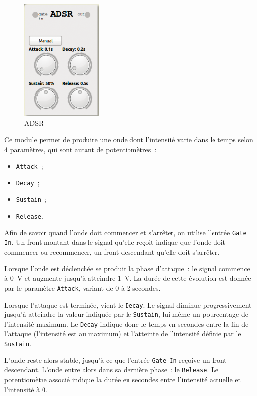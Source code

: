 \documentclass[a4paper,oneside,frenchb,10pt]{article}
\begin{document}
\begin{multicols}{2}
\begin{figure}[H]
\centering
\includegraphics[width=4cm]{../img/png/adsr.png}
\caption{ADSR}
\end{figure}

Ce module permet de produire une onde dont l'intensité varie dans le
temps selon 4 paramètres, qui sont autant de potentiomètres~:

\begin{itemize}
\item
  \verb!Attack!~;
\item
  \verb!Decay!~;
\item
  \verb!Sustain!~;
\item
  \verb!Release!.
\end{itemize}

Afin de savoir quand l'onde doit commencer et s'arrêter, on utilise
l'entrée \verb!Gate In!. Un front montant dans le signal qu'elle reçoit
indique que l'onde doit commencer ou recommencer, un front descendant
qu'elle doit s'arrêter.

Lorsque l'onde est déclenchée se produit la phase d'attaque~: le signal
commence à 0~V et augmente jusqu'à atteindre 1~V. La durée de cette
évolution est donnée par le paramètre \verb!Attack!, variant de 0 à 2
secondes.
\end{multicols}

Lorsque l'attaque est terminée, vient le \verb!Decay!. Le signal diminue
progressivement jusqu'à atteindre la valeur indiquée par le
\verb!Sustain!, lui même un pourcentage de l'intensité maximum. Le
\verb!Decay! indique donc le temps en secondes entre la fin de l'attaque
(l'intensité est au maximum) et l'atteinte de l'intensité définie
par le \verb!Sustain!.

L'onde reste alors stable, jusqu'à ce que l'entrée \verb!Gate In!
reçoive un front descendant. L'onde entre alors dans sa dernière phase~:
le \verb!Release!. Le potentiomètre associé indique la durée en secondes
entre l'intensité actuelle et l'intensité à 0.
\end{document}
